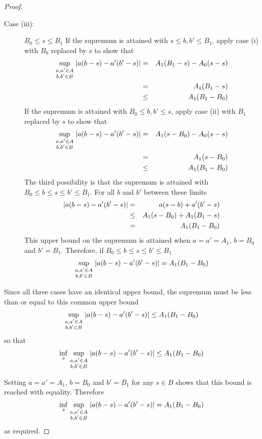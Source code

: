 \begin{proof}
\begin{description}
\item[Case (iii):] $B_0\leq s \leq B_1$\hfill\mbox{}\linebreak 
If the supremum is attained with $s\leq b,b'\leq B_1$, apply case (i) with
$B_0$ replaced by $s$ to show that
\begin{eqnarray}
\sup_{\scriptstyle a,a'\in A\atop\scriptstyle b,b'\in B}
\left|a(b-s)-a'(b'-s)\right|
&=&A_1(B_1-s)-A_0(s-s){\nonumber}\\
&=&A_1(B_1-s){\nonumber}\\
&\leq&A_1(B_1-B_0)
\end{eqnarray}
If the supremum is attained with $B_0\leq b,b'\leq s$, apply case (ii) with
$B_1$ replaced by $s$ to show that
\begin{eqnarray}
\sup_{\scriptstyle a,a'\in A\atop\scriptstyle b,b'\in B}
\left|a(b-s)-a'(b'-s)\right|
&=&A_1(s-B_0)-A_0(s-s){\nonumber}\\
&=&A_1(s-B_0){\nonumber}\\
&\leq&A_1(B_1-B_0)
\end{eqnarray}
The third possibility is that the supremum is attained with $B_0\leq b\leq
s\leq b'\leq B_1$.  For all $b$ and $b'$ between these limits
\begin{eqnarray}
\left|a(b-s)-a'(b'-s)\right|&=&a(s-b)+a'(b'-s){\nonumber}\\
&\leq&A_1(s-B_0)+A_1(B_1-s){\nonumber}\\
&=&A_1(B_1-B_0)
\end{eqnarray}
This upper bound on the supremum is attained when $a=a'=A_1$, $b=B_0$ and
$b'=B_1$.  Therefore, if $B_0\leq b\leq s\leq b'\leq B_1$
\begin{equation}
\sup_{\scriptstyle a,a'\in A\atop\scriptstyle b,b'\in B}
\left|a(b-s)-a'(b'-s)\right|=A_1(B_1-B_0)
\end{equation}
\end{description}

Since all three cases have an identical upper bound, the supremum must be
less than or equal to this common upper bound
\begin{equation}
\sup_{\scriptstyle a,a'\in A\atop\scriptstyle b,b'\in B}
\left|a(b-s)-a'(b'-s)\right|\leq A_1(B_1-B_0)
\end{equation}
so that
\begin{equation}
\inf_s\sup_{\scriptstyle a,a'\in A\atop\scriptstyle b,b'\in B}
\left|a(b-s)-a'(b'-s)\right|\leq A_1(B_1-B_0)
\end{equation}

Setting $a=a'=A_1$, $b=B_0$ and $b'=B_1$ for any $s\in B$ shows that
this bound is reached with equality.  Therefore
\begin{equation}
\inf_s\sup_{\scriptstyle a,a'\in A\atop\scriptstyle b,b'\in B}
\left|a(b-s)-a'(b'-s)\right|=A_1(B_1-B_0)
\end{equation}
as required.
\end{proof}

